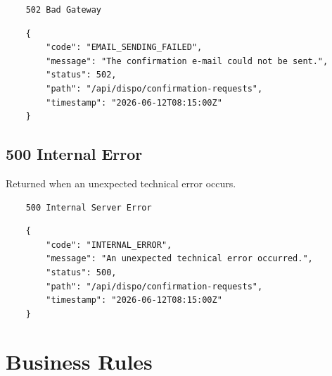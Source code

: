 \documentclass[a4paper,11pt]{article}
\begin{document}
\begin{lstlisting}
	502 Bad Gateway
\end{lstlisting}

\begin{lstlisting}
	{
		"code": "EMAIL_SENDING_FAILED",
		"message": "The confirmation e-mail could not be sent.",
		"status": 502,
		"path": "/api/dispo/confirmation-requests",
		"timestamp": "2026-06-12T08:15:00Z"
	}
\end{lstlisting}

\subsection{500 Internal Error}

Returned when an unexpected technical error occurs.

\begin{lstlisting}
	500 Internal Server Error
\end{lstlisting}

\begin{lstlisting}
	{
		"code": "INTERNAL_ERROR",
		"message": "An unexpected technical error occurred.",
		"status": 500,
		"path": "/api/dispo/confirmation-requests",
		"timestamp": "2026-06-12T08:15:00Z"
	}
\end{lstlisting}

\section{Business Rules}
\end{document}
